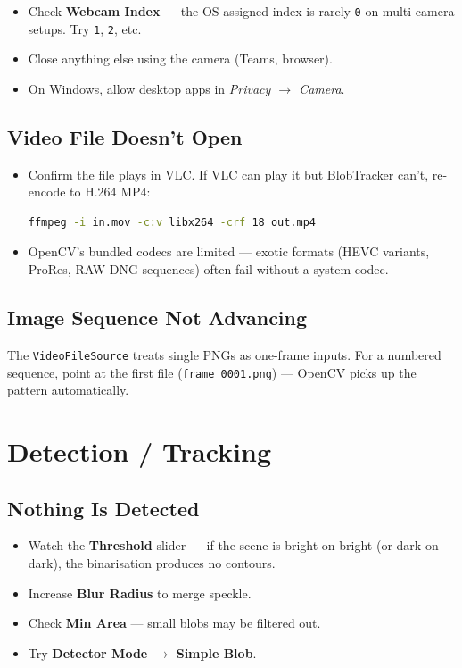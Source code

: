 \documentclass[11pt,a4paper,openany]{report}
\begin{document}
\begin{itemize}
    \item Check \textbf{Webcam Index} --- the OS-assigned index is rarely
        \texttt{0} on multi-camera setups. Try \texttt{1}, \texttt{2}, etc.
    \item Close anything else using the camera (Teams, browser).
    \item On Windows, allow desktop apps in \emph{Privacy $\rightarrow$
        Camera}.
\end{itemize}

\subsection{Video File Doesn't Open}

\begin{itemize}
    \item Confirm the file plays in VLC. If VLC can play it but BlobTracker
        can't, re-encode to H.264 MP4:
\begin{lstlisting}[language=bash]
ffmpeg -i in.mov -c:v libx264 -crf 18 out.mp4
\end{lstlisting}
    \item OpenCV's bundled codecs are limited --- exotic formats (HEVC
        variants, ProRes, RAW DNG sequences) often fail without a system
        codec.
\end{itemize}

\subsection{Image Sequence Not Advancing}

The \texttt{VideoFileSource} treats single PNGs as one-frame inputs. For a
numbered sequence, point at the first file (\texttt{frame\_0001.png}) ---
OpenCV picks up the pattern automatically.

\section{Detection / Tracking}

\subsection{Nothing Is Detected}

\begin{itemize}
    \item Watch the \textbf{Threshold} slider --- if the scene is bright on
        bright (or dark on dark), the binarisation produces no contours.
    \item Increase \textbf{Blur Radius} to merge speckle.
    \item Check \textbf{Min Area} --- small blobs may be filtered out.
    \item Try \textbf{Detector Mode $\rightarrow$ Simple Blob}.
\end{itemize}
\end{document}
